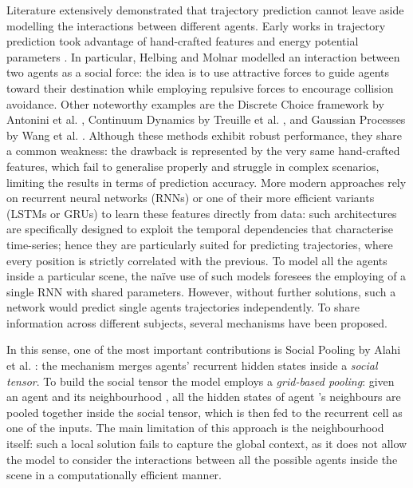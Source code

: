 \documentclass[10pt,a4paper,conference]{IEEEtran}
\begin{document}
Literature extensively demonstrated that trajectory prediction cannot leave aside modelling the interactions between different agents. 
Early works in trajectory prediction took advantage of hand-crafted features and energy potential parameters \cite{socialforce, discrete_choice, continuum_dynamics, gaussian_process}. In particular, Helbing and Molnar \cite{socialforce} modelled an interaction between two agents as a social force: the idea is to use attractive forces to guide agents toward their destination while employing repulsive forces to encourage collision avoidance. Other noteworthy examples are the Discrete Choice framework by Antonini et al. \cite{discrete_choice}, Continuum Dynamics by Treuille et al.
\cite{continuum_dynamics}, and Gaussian Processes by Wang et al. \cite{gaussian_process}. Although these methods exhibit robust performance, they share a common weakness: the drawback is represented by the very same hand-crafted features, which fail to generalise properly and struggle in complex scenarios, limiting the results in terms of prediction accuracy.
More modern approaches \cite{slstm, soft+, desire} rely on recurrent neural networks (RNNs) or one of their more efficient variants (LSTMs or GRUs) to learn these features directly from data: such architectures are specifically designed to exploit the temporal dependencies that characterise time-series; hence they are particularly suited for predicting trajectories, where every position is strictly correlated with the previous. To model all the agents inside a particular scene, the na\"ive use of such models foresees the employing of a single RNN with shared parameters. However, without further solutions, such a network would predict single agents trajectories independently.
To share information across different subjects, several mechanisms have been proposed.

In this sense, one of the most important contributions is Social Pooling by Alahi et al. \cite{slstm}: the mechanism merges agents' recurrent hidden states inside a \textit{social tensor}. To build the social tensor the model employs a \textit{grid-based pooling}: given an agent  and its neighbourhood , all the hidden states of agent 's neighbours are pooled together inside the social tensor, which is then fed to the recurrent cell as one of the inputs. The main limitation of this approach is the neighbourhood itself: such a local solution fails to capture the global context, as it does not allow the model to consider the interactions between all the possible agents inside the scene in a computationally efficient manner.
\end{document}
